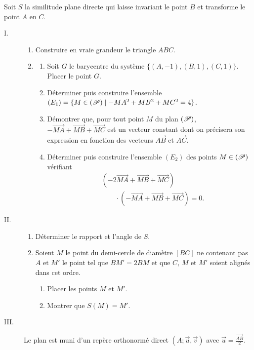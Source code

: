 Soit $S$ la similitude plane directe qui laisse invariant le point $B$ et transforme le point $A$ en $C$.
\begin{description}
	\item[I. ] 
		\begin{enumerate}
			\item Construire en vraie grandeur le triangle $ABC$.
			\item %
				\begin{enumerate}
					\item Soit $G$ le barycentre du syst\`eme $\{ (A,-1),(B,1),(C,1) \}$. Placer le point $G$.
					\item D\'eterminer puis construire l'ensemble 
						$(E_1) = \{ M \in (\mathscr{P}) \mid -MA^2 + MB^2 + MC^2 = 4 \}$.
					\item D\'emontrer que, pour tout point $M$ du plan $(\mathscr{P})$, 	
						$- \overrightarrow{MA} + \overrightarrow{MB} + \overrightarrow{MC}$ 
						est un vecteur constant dont on pr\'ecisera son expression en fonction des vecteurs 
						$\overrightarrow{AB}$ et $\overrightarrow{AC}$.
					\item D\'eterminer puis construire l'ensemble $(E_2)$ des points $M\in(\mathscr{P})$ v\'erifiant
						\[
						\begin{aligned}
						&(-2\overrightarrow{MA}+\overrightarrow{MB}+\overrightarrow{MC})\\
						&\qquad\cdot(-\overrightarrow{MA}+\overrightarrow{MB}+\overrightarrow{MC})=0.
						\end{aligned}
						\]
				\end{enumerate}
		\end{enumerate}
	\item[II. ]
		\begin{enumerate}
			\item D\'eterminer le rapport et l'angle de $S$.
			\item Soient $M$ le point du demi-cercle de diam\`etre $[BC]$ ne contenant pas $A$ et $M'$ le point tel que 
				$BM' = 2 BM$ et que $C$, $M$ et $M'$ soient align\'es dans cet ordre.
				\begin{enumerate}
					\item Placer les points $M$ et $M'$.
					\item Montrer que $S(M) = M'$.
				\end{enumerate}
		\end{enumerate}
	\item[III. ]
		Le plan est muni d'un rep\`ere orthonorm\'e direct $(A ; \vec{u} , \vec{v})$ avec $\vec{u} = \frac{\overrightarrow{AB}}{2}$.

\end{description}
